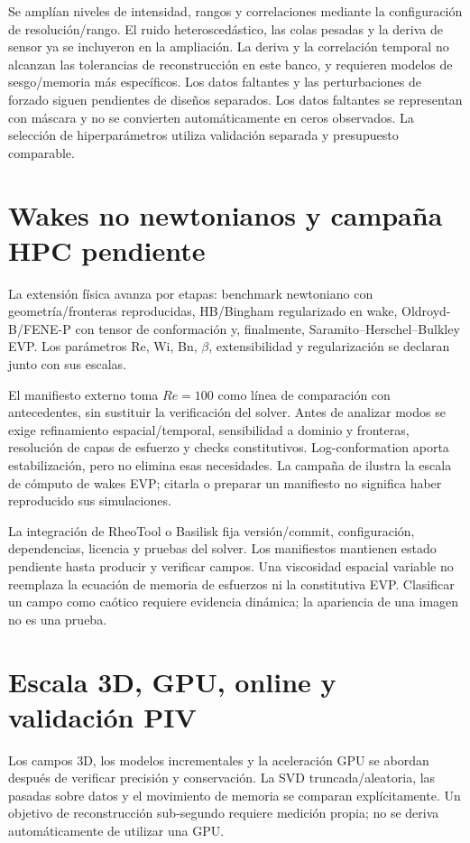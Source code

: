 \documentclass[11pt,oneside,openany]{book}
\begin{document}
Se amplían niveles de intensidad, rangos y correlaciones mediante la
configuración de resolución/rango. El ruido heteroscedástico, las colas pesadas y la deriva de sensor ya se
incluyeron en la ampliación. La deriva y la correlación temporal no alcanzan
las tolerancias de reconstrucción en este banco, y requieren modelos de
sesgo/memoria más específicos. Los datos faltantes y las perturbaciones de
forzado siguen pendientes de diseños separados. Los datos faltantes se representan con máscara y no se
convierten automáticamente en ceros observados. La selección de
hiperparámetros utiliza validación separada y presupuesto comparable.

\section{Wakes no newtonianos y campaña HPC pendiente}
La extensión física avanza por etapas: benchmark newtoniano con
geometría/fronteras reproducidas, HB/Bingham regularizado en wake,
Oldroyd-B/FENE-P con tensor de conformación y, finalmente,
Saramito--Herschel--Bulkley EVP. Los parámetros Re, Wi, Bn, $\beta$,
extensibilidad y regularización se declaran junto con sus escalas.

El manifiesto externo toma $Re=100$ como línea de comparación con
antecedentes, sin sustituir la verificación del solver. Antes de analizar
modos se exige refinamiento espacial/temporal, sensibilidad a dominio y
fronteras, resolución de capas de esfuerzo y checks constitutivos.
Log-conformation aporta estabilización, pero no elimina esas
necesidades. La campaña de \citet{corrochano2026evp} ilustra la escala
de cómputo de wakes EVP; citarla o preparar un manifiesto no significa
haber reproducido sus simulaciones.

La integración de RheoTool o Basilisk fija versión/commit,
configuración, dependencias, licencia y pruebas del solver. Los
manifiestos mantienen estado pendiente hasta producir y verificar
campos. Una viscosidad espacial variable no reemplaza la ecuación de
memoria de esfuerzos ni la constitutiva EVP. Clasificar un campo como
caótico requiere evidencia dinámica; la apariencia de una imagen no
es una prueba.

\section{Escala 3D, GPU, online y validación PIV}
Los campos 3D, los modelos incrementales y la aceleración GPU se
abordan después de verificar precisión y conservación. La SVD
truncada/aleatoria, las pasadas sobre datos y el movimiento de memoria
se comparan explícitamente. Un objetivo de reconstrucción sub-segundo requiere medición propia; no se deriva automáticamente de utilizar una GPU.
\end{document}
